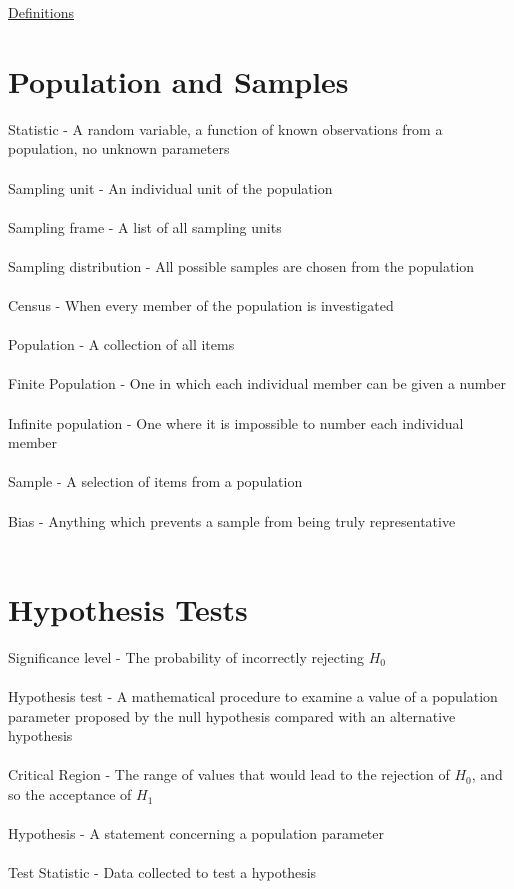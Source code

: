 \documentclass{article}[18pt]
\begin{document}
\begin{center}
\underline{\huge Definitions}
\end{center}
\large
\section{Population and Samples}
Statistic - A random variable, a function of known observations from a population, no unknown parameters\\
\\
Sampling unit - An individual unit of the population\\
\\
Sampling frame - A list of all sampling units\\
\\
Sampling distribution - All possible samples are chosen from the population\\
\\
Census - When every member of the population is investigated\\
\\
Population - A collection of all items\\
\\
Finite Population - One in which each individual member can be given a number\\
\\
Infinite population - One where it is impossible to number each individual member\\
\\
Sample - A selection of items from a population\\
\\
Bias - Anything which prevents a sample from being truly representative\\
\\
\section{Hypothesis Tests}
Significance level - The probability of incorrectly rejecting $H_0$\\
\\
Hypothesis test - A mathematical procedure to examine a value of
a population parameter proposed by the null hypothesis compared with an alternative hypothesis\\
\\
Critical Region - The range of values that would lead to the rejection of $H_0$, and so the acceptance of $H_1$\\
\\
Hypothesis - A statement concerning a population parameter\\
\\
Test Statistic - Data collected to test a hypothesis
\end{document}
